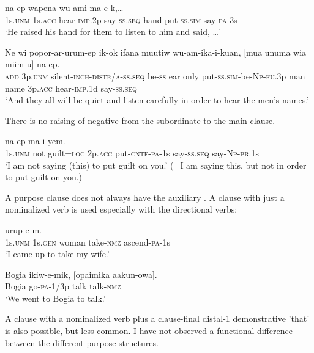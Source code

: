 \ea%
\label{ex:x1619}
 na-ep wapena wu-ami ma-e-k,{\dots}\\
1s.\textsc{unm} 1s.\textsc{acc} hear-\textsc{imp}.2p say-\textsc{ss}.\textsc{seq} hand put-\textsc{ss}.\textsc{sim} say-\textsc{pa}-3s\\
\glt`He raised his hand for them to listen to him and said, {\dots}'
\z


\ea%
\label{ex:x1627}
\gll Ne  wi  popor-ar-urum-ep  ik-ok  ifana  muutiw wu-am-ika-i-kuan,  [mua  unuma  wia  miim-u] na-ep.\\
\textsc{add} 3p.\textsc{unm} silent-\textsc{inch}-\textsc{distr}/\textsc{a}-\textsc{ss}.\textsc{seq} be-\textsc{ss} ear  only put-\textsc{ss}.\textsc{sim}-be-\textsc{Np}-\textsc{fu}.3p  man  name  3p.\textsc{acc} hear-\textsc{imp}.1d say-\textsc{ss}.\textsc{seq}\\
\glt`And they all will be quiet and listen carefully in order to hear the men's names.'
\z


There is no raising of negative from the subordinate to the main clause. 

\ea%
\label{ex:x1623}
\gll [Yo  me  pina=pa  nia  wu-ek-a-m]  na-ep ma-i-yem. \\
1s.\textsc{unm} not guilt=\textsc{loc} 2p.\textsc{acc} put-\textsc{cntf}-\textsc{pa}-1s say-\textsc{ss}.\textsc{seq} say-\textsc{Np}-\textsc{pr}.1s\\
\glt`I am not saying (this) to put guilt on you.' (=I am saying this, but not in order to put guilt on you.)
\z


A purpose clause does not always have the auxiliary . A clause with just a nominalized verb is used especially with the directional verbs: 

\ea%
\label{ex:x1659}
  urup-e-m.\\
1s.\textsc{unm} 1s.\textsc{gen} woman take-\textsc{nmz} ascend-\textsc{pa}-1s\\
\glt`I came up to take my wife.'
\z


\ea%
\label{ex:x1658}
\gll Bogia  ikiw-e-mik,  [opaimika  aakun-owa]. \\
Bogia  go-\textsc{pa}-1/3p talk talk-\textsc{nmz}\\
\glt`We went to Bogia to talk.'
\z


A clause with a nominalized verb plus a clause-final distal-1 demonstrative  'that' is also possible, but less common. I have not observed a functional difference between the different purpose structures.

